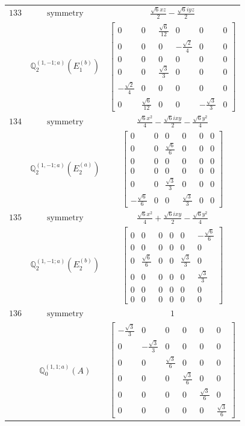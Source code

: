 \documentclass[fleqn,8pt,landscape]{jsarticle}
\begin{document}
\begin{longtable}{ccc}
$ 133 $ & $ \text{symmetry} $ & $ \frac{\sqrt{6} x z}{2} - \frac{\sqrt{6} i y z}{2} $ \\
$  $ & $ \mathbb{Q}_{2}^{(1,-1;a)}(E_{1}^{(b)}) $ & $ \begin{bmatrix} 0 & 0 & \frac{\sqrt{6}}{12} & 0 & 0 & 0 \\ 0 & 0 & 0 & - \frac{\sqrt{2}}{4} & 0 & 0 \\ 0 & 0 & 0 & 0 & 0 & 0 \\ 0 & 0 & \frac{\sqrt{3}}{3} & 0 & 0 & 0 \\ - \frac{\sqrt{2}}{4} & 0 & 0 & 0 & 0 & 0 \\ 0 & \frac{\sqrt{6}}{12} & 0 & 0 & - \frac{\sqrt{3}}{3} & 0 \end{bmatrix} $ \\ \hline
$ 134 $ & $ \text{symmetry} $ & $ \frac{\sqrt{6} x^{2}}{4} - \frac{\sqrt{6} i x y}{2} - \frac{\sqrt{6} y^{2}}{4} $ \\
$  $ & $ \mathbb{Q}_{2}^{(1,-1;a)}(E_{2}^{(a)}) $ & $ \begin{bmatrix} 0 & 0 & 0 & 0 & 0 & 0 \\ 0 & 0 & \frac{\sqrt{6}}{6} & 0 & 0 & 0 \\ 0 & 0 & 0 & 0 & 0 & 0 \\ 0 & 0 & 0 & 0 & 0 & 0 \\ 0 & 0 & \frac{\sqrt{3}}{3} & 0 & 0 & 0 \\ - \frac{\sqrt{6}}{6} & 0 & 0 & \frac{\sqrt{3}}{3} & 0 & 0 \end{bmatrix} $ \\ \hline
$ 135 $ & $ \text{symmetry} $ & $ \frac{\sqrt{6} x^{2}}{4} + \frac{\sqrt{6} i x y}{2} - \frac{\sqrt{6} y^{2}}{4} $ \\
$  $ & $ \mathbb{Q}_{2}^{(1,-1;a)}(E_{2}^{(b)}) $ & $ \begin{bmatrix} 0 & 0 & 0 & 0 & 0 & - \frac{\sqrt{6}}{6} \\ 0 & 0 & 0 & 0 & 0 & 0 \\ 0 & \frac{\sqrt{6}}{6} & 0 & 0 & \frac{\sqrt{3}}{3} & 0 \\ 0 & 0 & 0 & 0 & 0 & \frac{\sqrt{3}}{3} \\ 0 & 0 & 0 & 0 & 0 & 0 \\ 0 & 0 & 0 & 0 & 0 & 0 \end{bmatrix} $ \\ \hline
$ 136 $ & $ \text{symmetry} $ & $ 1 $ \\
$  $ & $ \mathbb{Q}_{0}^{(1,1;a)}(A) $ & $ \begin{bmatrix} - \frac{\sqrt{3}}{3} & 0 & 0 & 0 & 0 & 0 \\ 0 & - \frac{\sqrt{3}}{3} & 0 & 0 & 0 & 0 \\ 0 & 0 & \frac{\sqrt{3}}{6} & 0 & 0 & 0 \\ 0 & 0 & 0 & \frac{\sqrt{3}}{6} & 0 & 0 \\ 0 & 0 & 0 & 0 & \frac{\sqrt{3}}{6} & 0 \\ 0 & 0 & 0 & 0 & 0 & \frac{\sqrt{3}}{6} \end{bmatrix} $ \\ \hline

\end{longtable}
\end{document}
